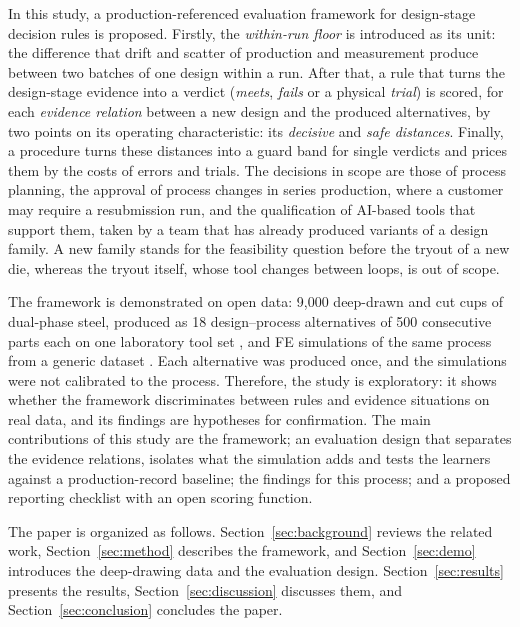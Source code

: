 \documentclass[pdflatex,sn-basic,lineno]{sn-jnl}
\begin{document}
In this study, a production-referenced evaluation framework for design-stage decision rules is proposed. Firstly, the \emph{within-run floor} is introduced as its unit: the difference that drift and scatter of production and measurement produce between two batches of one design within a run. After that, a rule that turns the design-stage evidence into a verdict (\emph{meets}, \emph{fails} or a physical \emph{trial}) is scored, for each \emph{evidence relation} between a new design and the produced alternatives, by two points on its operating characteristic: its \emph{decisive} and \emph{safe distances}. Finally, a procedure turns these distances into a guard band for single verdicts and prices them by the costs of errors and trials. The decisions in scope are those of process planning, the approval of process changes in series production, where a customer may require a resubmission run, and the qualification of AI-based tools that support them, taken by a team that has already produced variants of a design family. A new family stands for the feasibility question before the tryout of a new die, whereas the tryout itself, whose tool changes between loops, is out of scope.

The framework is demonstrated on open data: 9,000 deep-drawn and cut cups of dual-phase steel, produced as 18 design--process alternatives of 500 consecutive parts each on one laboratory tool set \citep{baum2026rddac}, and FE simulations of the same process from a generic dataset \citep{baum2025ddacs}. Each alternative was produced once, and the simulations were not calibrated to the process. Therefore, the study is exploratory: it shows whether the framework discriminates between rules and evidence situations on real data, and its findings are hypotheses for confirmation. The main contributions of this study are the framework; an evaluation design that separates the evidence relations, isolates what the simulation adds and tests the learners against a production-record baseline; the findings for this process; and a proposed reporting checklist with an open scoring function.

The paper is organized as follows. Section~\ref{sec:background} reviews the related work, Section~\ref{sec:method} describes the framework, and Section~\ref{sec:demo} introduces the deep-drawing data and the evaluation design. Section~\ref{sec:results} presents the results, Section~\ref{sec:discussion} discusses them, and Section~\ref{sec:conclusion} concludes the paper.

\end{document}
